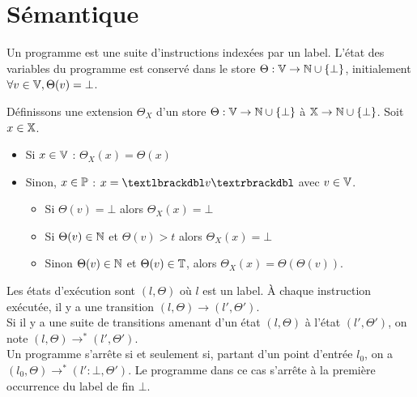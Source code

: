 \section{Sémantique}
Un programme est une suite d'instructions indexées par un label. L'état des variables du programme est conservé dans le store $\Theta:\mathbb V\rightarrow\mathbb N\cup\{\bot\}$, initialement $\forall v\in\mathbb V, \Theta(v)=\bot$.\\
\begin{defi}
 Définissons une extension $\Theta_X$ d'un store $\Theta : \mathbb V\rightarrow\mathbb N\cup\{\bot\}$ à $\mathbb X\rightarrow\mathbb N\cup\{\bot\}$. Soit $x\in\mathbb X$.
 \begin{itemize}
  \item Si $x\in\mathbb V$ : $\Theta_X(x)=\Theta(x)$
  \item Sinon, $x\in\mathbb P$ : $x=\textlbrackdbl v\textrbrackdbl$ avec $v\in\mathbb V$.
  \begin{itemize}
   \item Si $\Theta(v)=\bot$ alors $\Theta_X(x)=\bot$
   \item Si $\Theta(v)\in\mathbb N$ et $\Theta(v)>t$ alors $\Theta_X(x)=\bot$
   \item Sinon $\Theta(v)\in\mathbb N$ et $\Theta(v)\in\mathbb T$, alors $\Theta_X(x)=\Theta(\Theta(v))$.
  \end{itemize}

 \end{itemize}
\end{defi}
Les états d'exécution sont $(l, \Theta)$ où $l$ est un label. À chaque instruction exécutée, il y a une transition $(l, \Theta)\rightarrow(l', \Theta')$.\\
Si il y a une suite de transitions amenant d'un état $(l, \Theta)$ à l'état $(l', \Theta')$, on note $(l, \Theta)\rightarrow^*(l', \Theta')$.\\
Un programme s'arrête si et seulement si, partant d'un point d'entrée $l_0$, on a $(l_0, \Theta)\rightarrow^*(l' : \bot, \Theta')$. Le programme dans ce cas s'arrête à la première occurrence du label de fin $\bot$.

